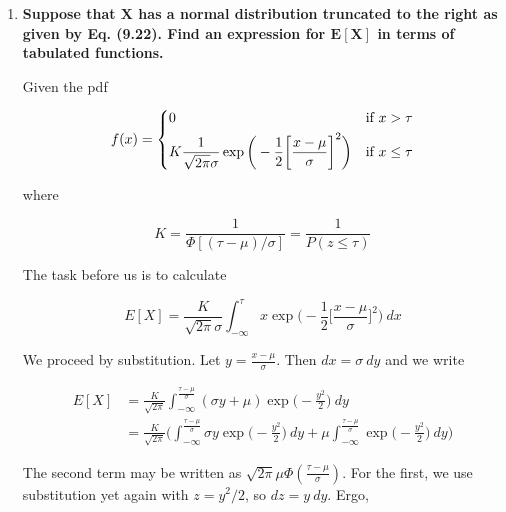 \documentclass[10pt, oneside]{article}
\begin{document}
\begin{enumerate}[label=9.\arabic*]
\begin{thm}
where all the partial derivatives are evaluated at $(\mu_x, \mu_y)$.

\end{thm}

Given $Y = \ln X$, we need only calculate $\partial Y / \partial x = 1/x$ and $\partial^2 Y / \partial x^2 = -1/x^2$. Then $\boxed{ E[Y] \approx \ln \mu - \frac{\sigma^2}{2\mu^2}, V[Y] \approx \sigma^2/\mu^2 }$.

\item  \begin{tcolorbox}[
  colback=Cerulean!5!white,
  colframe=Cerulean!75!black]
\textbf{Suppose that $\bm{X}$ has a normal distribution truncated to the right as given by Eq. (9.22). Find an expression for $\bm{E[X]}$ in terms of tabulated functions.}
\end{tcolorbox}

Given the pdf

\[
f(x) = \begin{dcases}
0 & \text{if } x > \tau \\
K \frac{1}{\sqrt{2\pi} \sigma} \exp \bigg( -\frac{1}{2} \bigg[ \frac{x-\mu}{\sigma} \bigg]^2 \bigg) & \text{if } x \leq \tau
\end{dcases} 
\]

where

\[ K = \frac{1}{\Phi[(\tau - \mu) / \sigma]} = \frac{1}{P(z \leq \tau)}  \]

The task before us is to calculate

\[ E[X] = \frac{K}{\sqrt{2\pi} \sigma} \int^\tau_{-\infty} x \exp \bigg( -\frac{1}{2} \bigg[ \frac{x-\mu}{\sigma} \bigg]^2 \bigg) \ dx \]

We proceed by substitution. Let $y = \frac{x-\mu}{\sigma}$. Then $dx = \sigma \ dy$ and we write

\begin{align*}
E[X] &= \frac{K}{\sqrt{2\pi}} \int^{\frac{\tau - \mu}{\sigma}}_{-\infty} (\sigma y + \mu) \exp \bigg( -\frac{y^2}{2} \bigg) \ dy \\
&= \frac{K}{\sqrt{2\pi}} \bigg( \int^{\frac{\tau - \mu}{\sigma}}_{-\infty} \sigma y  \exp \bigg( -\frac{y^2}{2} \bigg) \ dy + \mu \int^{\frac{\tau - \mu}{\sigma}}_{-\infty}  \exp \bigg( -\frac{y^2}{2} \bigg) \ dy \bigg)
\end{align*}

The second term may be written as $\sqrt{2\pi} \mu \Phi (\frac{\tau-\mu}{\sigma})$. For the first, we use substitution yet again with $z = y^2/2$, so $dz = y \ dy$. Ergo,


\end{enumerate}
\end{document}
